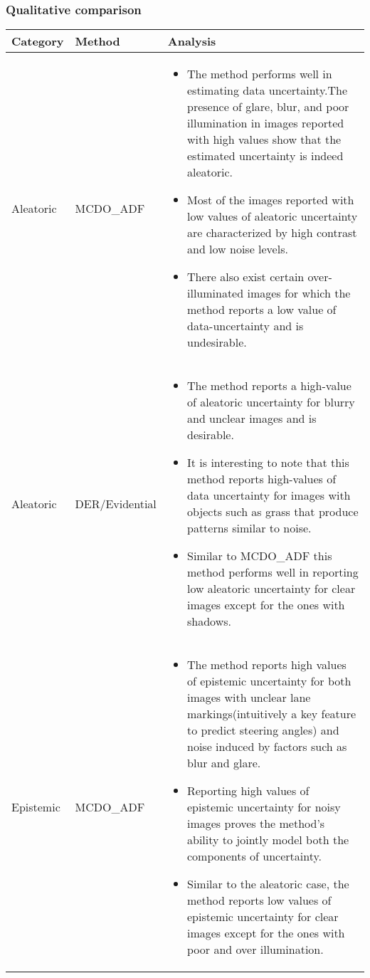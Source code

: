 \subsubsection{Qualitative comparison}
\begin{table}[h]
\begin{tabular}[h]{|p{1.5cm}|p{2.3cm}|p{13.5cm}|}
\hline
\textbf{Category}&\textbf{Method}&\textbf{Analysis}\\
\hline
Aleatoric&MCDO\_ADF&\begin{itemize}\item The method performs well in estimating data uncertainty.The presence of glare, blur, and poor illumination in images reported with high values show that the estimated uncertainty is indeed aleatoric. \item Most of the images reported with low values of aleatoric uncertainty are characterized by high contrast and low noise levels. \item There also exist certain over-illuminated images for which the method reports a low value of data-uncertainty and is undesirable.\end{itemize}\\
\hline
Aleatoric&DER/Evidential&\begin{itemize}\item The method reports a high-value of aleatoric uncertainty for blurry and unclear images and is desirable.\item  It is interesting to note that this method reports high-values of data uncertainty for images with objects such as grass that produce patterns similar to noise.\item Similar to MCDO\_ADF this method performs well in reporting low aleatoric uncertainty for clear images except for the ones with shadows.\end{itemize}\\
\hline
Epistemic&MCDO\_ADF&\begin{itemize}\item The method reports high values of epistemic uncertainty for both images with unclear lane markings(intuitively a key feature to predict steering angles) and noise induced by factors such as blur and glare.\item Reporting high values of epistemic uncertainty for noisy images proves the method's ability to jointly model both the components of uncertainty.\item Similar to the aleatoric case, the method reports low values of epistemic uncertainty for clear images except for the ones with poor and over illumination.\end{itemize}\\

\end{tabular}
\end{table}

